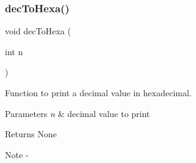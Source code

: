 \subsubsection{decToHexa()}
{\footnotesize\ttfamily void dec\+To\+Hexa (\begin{DoxyParamCaption}\item[{int}]{n }\end{DoxyParamCaption})}



Function to print a decimal value in hexadecimal. 


\begin{DoxyParams}{Parameters}
{\em n} & decimal value to print\\
\hline
\end{DoxyParams}
\begin{DoxyReturn}{Returns}
None
\end{DoxyReturn}
\begin{DoxyNote}{Note}
-\/ 
\end{DoxyNote}
